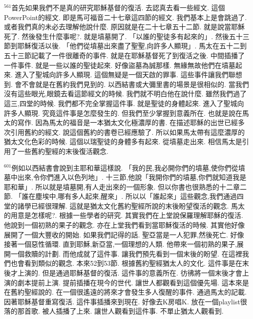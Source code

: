 \documentclass{book}
\begin{document}
$^{561}$首先如果我們不是真的研究耶穌基督的復活.
去認真去看一些經文.
這個PowerPoint的經文.
即是馬可福音二十七章這四節的經文.
我們基本上是會跳過了.
或者我們真的未必去理解他說什麼.
原因就是在二十七章五十二節.
就是說當耶穌死了.
然後發生什麼事呢?.
就是墳墓開了.
「以誰的聖徒多有起來的」.
然後五十三節到耶穌復活以後.
「他們從墳墓出來盡了聖聖,向許多人顯現」.
馬太在五十二到五十三節記載了一件很離奇的事件.
就是在耶穌基督死了到復活之後.
中間插播了一件事件.
就是一些以誰的聖徒起來.
好像盜墓為誠那樣.
無緣無故他們在墳墓起來.
進入了聖城向許多人顯現.
這個無疑是一個天啟的罪事.
這些事件讓我們聯想到.
會不會就是在舊約我們見到的.
以西結書或大彌里書的場景是很相似的.
當我們沒有這些眼光,眼鏡去看這節經文的時候.
我們就不明白他在說什麼.
雖然我們過了這三,四堂的時候.
我們都不完全掌握這件事.
就是聖徒的身體起來.
進入了聖城向許多人顯現.
究竟這件事是怎麼發生的.
但我們至少掌握到意義所在.
也就是說在馬太的寫作.
因為馬太的福音是一本猶太文化極濃厚的書.
在描述耶穌的出世已經多次引用舊約的經文.
說這個舊約的書卷已經應驗了.
所以如果馬太帶有這麼濃厚的猶太文化色彩的時候.
這個以瑞聖徒的身體多有起來.
從墳墓走出來.
相信馬太是引用了一些舊約聖經的末後復活觀念.

$^{601}$例如以西結書會說到主耶和華這樣說.
「我的民,我必開你們的墳墓,使你們從墳墓中出來,令你們進入以色列地」.
十三節,他說「我開你們的墳墓,你們就知道我是耶和華」.
所以就是墳墓開,有人走出來的一個形象.
但以你書也很熟悉的十二章二節.
「誰在塵埃中,哪有多人起來,醒來」.
所以以「誰起來」這些觀念,我們通過四堂的諸學已經很理解.
這就是猶太文化舊約聖經所說的末後盼望復活的觀念.
馬太的用意是怎樣呢?.
根據一些學者的研究.
其實我們在上堂說保羅理解耶穌的復活.
他說到一個初熟的果子的觀念.
亦在上堂我們看到當耶穌復活的時候.
其實他好像展開了一個大豐收的開始.
如果我們記得的話.
聖亞當是一人犯罪,然後死亡.
好像接著一個惡性循環.
直到耶穌,新亞當,一個理想的人類.
他帶來一個初熟的果子,展開一個救贖的計劃.
而他成就了這件事.
讓我們預先看到一個末後的盼望.
在這裡我們也會看到類似的觀念.
本來52到53節.
根據舊約聖經猶太人的文化.
這件事是在末後才上演的.
但是通過耶穌基督的復活.
這件事的意義所在.
彷彿將一個末後才會上演的劇本提前上演.
提前插播在現今的世代.
讓世人都觀看到這個優先場.
這本來是在舊約聖經說的.
在一個很遙遠的將來才會發生多人復醒的事件.
通過馬太的記載.
因著耶穌基督重寫復活.
這件事插播來到現在.
好像去K房唱K.
放在一個playlist很落的那首歌.
被人插播了上來.
讓世人觀看到這件事.
不單止猶太人觀看到.
\end{document}
